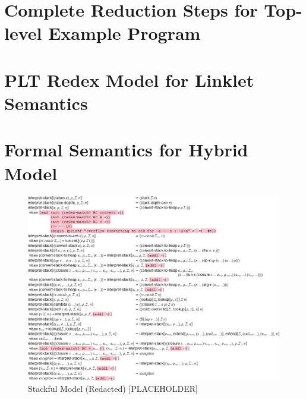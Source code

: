 \begin{appendices}
\chapter[\texorpdfstring{Complete Reduction Steps for Top-level Example Program}{Appendix B}]{Complete Reduction Steps for Top-level Example Program}
\label{appendix:formal-reduction-steps-toplevel-example}


\chapter[\texorpdfstring{PLT Redex Model for Linklet Semantics}{Appendix C}]{PLT Redex Model for Linklet Semantics}
\label{appendix:linklet-semantics-model-redex-code}


\chapter[\texorpdfstring{Formal Semantics for Hybrid Model}
                          {Appendix D}]{Formal Semantics for Hybrid Model}
\label{appendix:cek-stackful-redex}

    \vspace{-1cm}


    \begin{figure}[!h]
        \centering
        \includegraphics[scale=0.4]{sections/figures/interpret-stack-redacted.png}
        \caption{Stackful Model (Redacted) [PLACEHOLDER]}
        \label{fig:interpret-stack-redacted}
    \end{figure}


\end{appendices}
